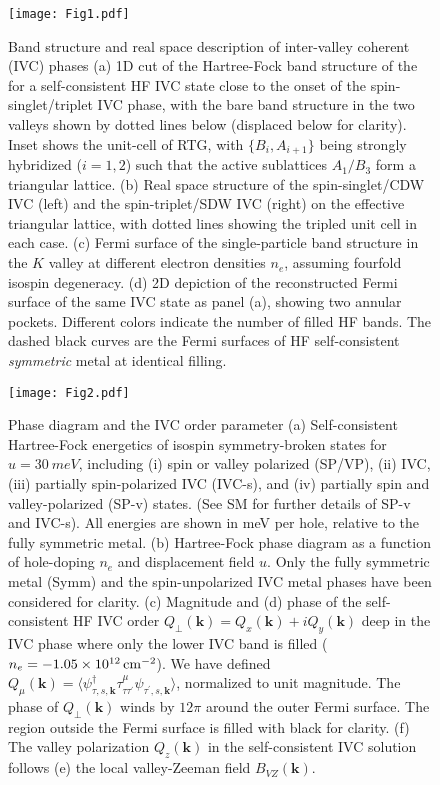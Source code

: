 \documentclass[aps,pra,twocolumn,superscriptaddress,10pt,article,nofootinbib,showpacs,longbibliography]{revtex4-1}
\def \k{{\mathbf k}}
\begin{document}
\begin{figure}[t]
\texttt{[image: Fig1.pdf]}
\centering
\caption{Band structure and real space description of inter-valley coherent (IVC) phases (a) 1D cut of the Hartree-Fock band structure of the for a self-consistent HF IVC state close to the onset of the spin-singlet/triplet IVC phase, with the bare band structure in the two valleys shown by dotted lines below (displaced below for clarity). Inset shows the unit-cell of RTG, with $\{B_i, A_{i+1}\}$ being strongly hybridized ($i=1,2$) such that the active sublattices $A_1/B_3$ form a triangular lattice.
(b) Real space structure of the spin-singlet/CDW IVC (left) and the spin-triplet/SDW IVC (right) on the effective triangular lattice, with dotted lines showing the tripled unit cell in each case.
(c) Fermi surface of the single-particle band structure in the $K$ valley at different electron densities $n_e$, assuming fourfold isospin degeneracy.
(d) 2D depiction of the reconstructed Fermi surface of the same IVC state as panel (a), showing two annular pockets. Different colors indicate the number of filled HF bands. The dashed black curves are the Fermi surfaces of HF self-consistent \emph{symmetric} metal at identical filling.}
\label{fig:FS}
\end{figure}

\begin{figure*}[t]
    \centering
    \texttt{[image: Fig2.pdf]}
    \caption{Phase diagram and the IVC order parameter (a) Self-consistent Hartree-Fock energetics of isospin symmetry-broken states for $u = \SI{30}{meV}$, including (i) spin or valley polarized (SP/VP), (ii) IVC, (iii) partially spin-polarized IVC (IVC-s), and (iv) partially spin and valley-polarized (SP-v) states. (See SM \cite{SM} for further details of SP-v and IVC-s). All energies are shown in meV per hole, relative to the fully symmetric metal. 
    (b) Hartree-Fock phase diagram as a function of hole-doping $n_e$ and displacement field $u$. Only the fully symmetric metal (Symm) and the spin-unpolarized IVC metal phases have been considered for clarity.
    (c) Magnitude and (d) phase of the self-consistent HF IVC order $Q_\perp(\k) = Q_x(\k) + i Q_y(\k)$ deep in the IVC phase where only the lower IVC band is filled ($n_e = \SI{-1.05E12}{\cm^{-2}}$).
    We have defined $Q_{\mu}(\k) =  \langle \psi_{\tau, s, \mathbf{k}}^{\dagger} \tau^{\mu}_{\tau \tau^\prime} \psi_{\tau^{\prime}, s, \mathbf{k}}\rangle$, normalized to unit magnitude. 
    The phase of $Q_\perp(\k)$ winds by $12 \pi$ around the outer Fermi surface. The region outside the Fermi surface is filled with black for clarity.
    (f) The valley polarization $Q_{z}(\k)$ in the self-consistent IVC solution follows (e) the local valley-Zeeman field $B_{VZ}(\k)$.}
    \label{fig:IVC}
\end{figure*}
\end{document}
